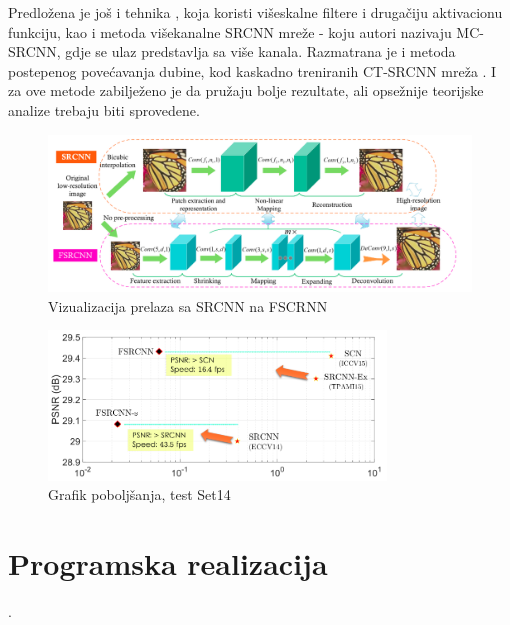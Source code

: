 \documentclass[12pt]{report}
\numberwithin{equation}{section}
\begin{document}
 Predložena je još i tehnika \cite{improv2}, koja koristi višeskalne filtere i drugačiju aktivacionu funkciju, kao i metoda višekanalne SRCNN mreže \cite{improv3} - koju autori nazivaju MC-SRCNN, gdje se ulaz predstavlja sa više kanala. Razmatrana je i metoda postepenog povećavanja dubine, kod kaskadno treniranih CT-SRCNN mreža \cite{improv4}. I za ove metode zabilježeno je da pružaju bolje rezultate, ali opsežnije teorijske analize trebaju biti sprovedene.
 
 \begin{figure}[h]
\includegraphics[width=\textwidth]{SLIKE/better}
\centering
\caption{Vizualizacija prelaza sa SRCNN na FSCRNN}
\label{fig:improv_1}
\end{figure}

\begin{figure}[h]
\includegraphics[width=0.8\textwidth]{SLIKE/diagram}
\centering
\caption{Grafik poboljšanja, test Set14}
\label{fig:improv_2}
\end{figure} 
 
        
   

\chapter{Programska realizacija}\label{ch2}
 
. 
 
\end{document}
